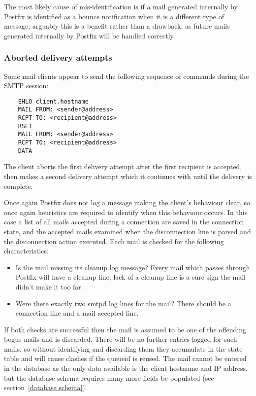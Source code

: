 \documentclass[a4paper,12pt,draft]{article}
\begin{document}
The most likely cause of mis-identification is if a mail generated
internally by Postfix is identified as a bounce notification when it is a
different type of message; arguably this is a benefit rather than a
drawback, as future mails generated internally by Postfix will be handled
correctly.

\subsubsection{Aborted delivery attempts}

\label{aborted-delivery-attempts}

Some mail clients appear to send the following sequence of commands during
the SMTP session:

\begin{verbatim}
    EHLO client.hostname
    MAIL FROM: <sender@address>
    RCPT TO: <recipient@address>
    RSET
    MAIL FROM: <sender@address>
    RCPT TO: <recipient@address>
    DATA
\end{verbatim}

The client aborts the first delivery attempt after the first recipient is
accepted, then makes a second delivery attempt which it continues with
until the delivery is complete.

Once again Postfix does not log a message making the client's behaviour
clear, so once again heuristics are required to identify when this
behaviour occurs.  In this case a list of all mails accepted during a
connection are saved in the connection state, and the accepted mails
examined when the disconnection line is parsed and the disconnection action
executed.  Each mail is checked for the following characteristics:

\begin{itemize}

    \item Is the mail missing its cleanup log message?  Every mail which
        passes through Postfix will have a cleanup line; lack of a cleanup
        line is a sure sign the mail didn't make it too far.

    \item Were there exactly two smtpd log lines for the mail?  There
        should be a connection line and a mail accepted line.

\end{itemize}

If both checks are successful then the mail is assumed to be one of the
offending bogus mails and is discarded.  There will be no further entries
logged for such mails, so without identifying and discarding them they
accumulate in the state table and will cause clashes if the queueid is
reused.  The mail cannot be entered in the database as the only data
available is the client hostname and IP address, but the database schema
requires many more fields be populated (see section~\ref{database schema}).
\end{document}
